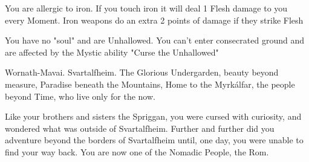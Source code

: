 {  

  You are allergic to iron.  If you touch iron it will deal 1 Flesh damage to you every Moment.  Iron weapons do an extra 2 points of damage if they strike Flesh

    
  You have no "soul" and are Unhallowed. You can't enter consecrated ground and are affected by the Mystic ability "Curse the Unhallowed"




  \newpage






  Wornath-Mavai. Svartalfheim. The Glorious Undergarden, beauty beyond measure, Paradise beneath the Mountains, Home to the Myrkálfar, the people beyond Time, who live only for the now.

  Like your brothers and sisters the Spriggan, you were cursed with curiosity, and wondered what was outside of Svartalfheim.  Further and further did you adventure beyond the borders of Svartalfheim until, one day, you were unable to find your way back.  You are now one of the Nomadic People, the Rom.

}
